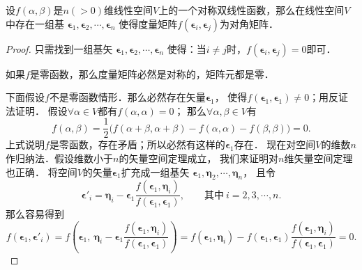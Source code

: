 \begin{theorem}\label{chmla:thm_obm}
    设$f(\alpha,\beta)$是$n(>0)$维线性空间$V$上的一个对称双线性函数，那么在线性空间$V$中存在一组基
    $\boldsymbol{\epsilon}_1,\boldsymbol{\epsilon}_2,\cdots,\boldsymbol{\epsilon}_n$
    使得度量矩阵$f(\boldsymbol{\epsilon}_i,\boldsymbol{\epsilon}_j)$为对角矩阵．
\end{theorem}
\begin{proof}
    只需找到一组基矢
    $\boldsymbol{\epsilon}_1,\boldsymbol{\epsilon}_2,\cdots,\boldsymbol{\epsilon}_n$
    使得：当$i \neq j$时，$f(\boldsymbol{\epsilon}_i,\boldsymbol{\epsilon}_j)=0$即可．

    如果$f$是零函数，那么度量矩阵必然是对称的，矩阵元都是零．

    下面假设$f$不是零函数情形．那么必然存在矢量$\boldsymbol{\epsilon}_1$，
    使得$f(\boldsymbol{\epsilon}_1,\boldsymbol{\epsilon}_1)\neq 0$；用反证法证明．
    假设$\forall \alpha \in V$都有$f(\alpha,\alpha)=0$；
    那么$\forall \alpha ,\beta \in V$有
    \begin{equation}
        f(\alpha,\beta)=\frac{1}{2}\bigl(
        f(\alpha+\beta,\alpha+\beta)-f(\alpha,\alpha)-f(\beta,\beta)
        \bigr) =0.
    \end{equation}
    上式说明$f$是零函数，存在矛盾；所以必然有这样的$\boldsymbol{\epsilon}_1$存在．
    现在对空间$V$的维数$n$作归纳法．假设维数小于$n$的矢量空间定理成立，
    我们来证明对$n$维矢量空间定理也正确．
    将空间$V$的矢量$\boldsymbol{\epsilon}_1$扩充成一组基矢
    $\boldsymbol{\epsilon}_1,\boldsymbol{\eta}_2,\cdots,\boldsymbol{\eta}_n$，
    且令
    \begin{equation*}
        \boldsymbol{\epsilon}'_i = \boldsymbol{\eta}_i - \boldsymbol{\epsilon}_1
        \frac{f(\boldsymbol{\epsilon}_1,\boldsymbol{\eta}_i)}
        {f(\boldsymbol{\epsilon}_1,\boldsymbol{\epsilon}_1)},
        \qquad \text{其中}\ i = 2,3,\cdots,n.
    \end{equation*}
    那么容易得到
    \begin{equation*}
        f(\boldsymbol{\epsilon}_1,\boldsymbol{\epsilon}'_i) =
        f\left(\boldsymbol{\epsilon}_1, \ \boldsymbol{\eta}_i - \boldsymbol{\epsilon}_1
        \frac{f(\boldsymbol{\epsilon}_1,\boldsymbol{\eta}_i)}
        {f(\boldsymbol{\epsilon}_1,\boldsymbol{\epsilon}_1)} \right)
        =f(\boldsymbol{\epsilon}_1,\boldsymbol{\eta}_i) -
        f(\boldsymbol{\epsilon}_1,\boldsymbol{\epsilon}_1)
        \frac{f(\boldsymbol{\epsilon}_1,\boldsymbol{\eta}_i)}
        {f(\boldsymbol{\epsilon}_1,\boldsymbol{\epsilon}_1)}        =0.

\end{equation*}
\end{proof}
